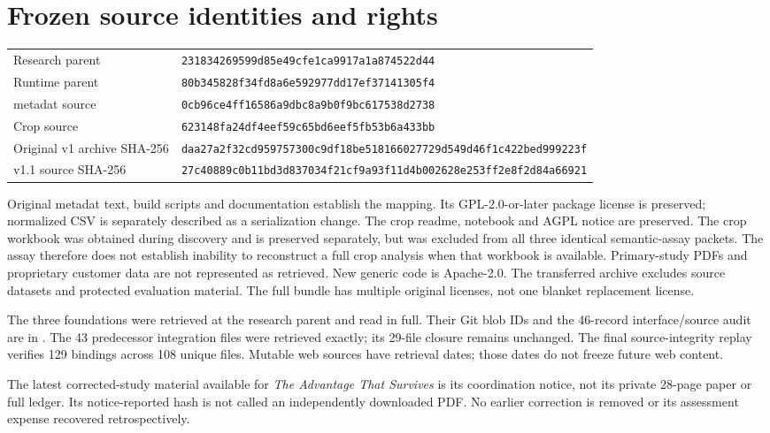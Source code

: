 \documentclass[10 pt]{article}
\begin{document}
\section{Frozen source identities and rights}

\begin{tabularx}{\textwidth}{p{}Y}
\toprule
Research parent &\nolinkurl{231834269599d85e49cfe1ca9917a1a874522d44}\\
Runtime parent &\nolinkurl{80b345828f34fd8a6e592977dd17ef37141305f4}\\
metadat source &\nolinkurl{0cb96ce4ff16586a9dbc8a9b0f9bc617538d2738}\\
Crop source &\nolinkurl{623148fa24df4eef59c65bd6eef5fb53b6a433bb}\\
Original v1 archive SHA-256 &\nolinkurl{daa27a2f32cd959757300c9df18be518166027729d549d46f1c422bed999223f}\\
v1.1 source SHA-256 &\nolinkurl{27c40889c0b11bd3d837034f21cf9a93f11d4b002628e253ff2e8f2d84a66921}\\
\bottomrule
\end{tabularx}

Original metadat text, build scripts and documentation establish the mapping. Its GPL-2.0-or-later package license is preserved; normalized CSV is separately described as a serialization change. The crop readme, notebook and AGPL notice are preserved. The crop workbook was obtained during discovery and is preserved separately, but was excluded from all three identical semantic-assay packets. The assay therefore does not establish inability to reconstruct a full crop analysis when that workbook is available. Primary-study PDFs and proprietary customer data are not represented as retrieved. New generic code is Apache-2.0. The transferred archive excludes source datasets and protected evaluation material. The full bundle has multiple original licenses, not one blanket replacement license.

The three foundations were retrieved at the research parent and read in full. Their Git blob IDs and the 46-record interface/source audit are in . The 43 predecessor integration files were retrieved exactly; its 29-file closure remains unchanged. The final source-integrity replay verifies 129 bindings across 108 unique files. Mutable web sources have retrieval dates; those dates do not freeze future web content.

The latest corrected-study material available for \emph{The Advantage That Survives} is its coordination notice, not its private 28-page paper or full ledger. Its notice-reported hash is not called an independently downloaded PDF. No earlier correction is removed or its assessment expense recovered retrospectively.
\end{document}
